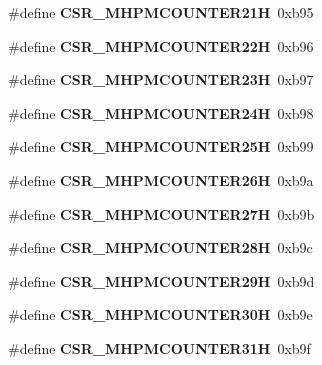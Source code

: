 \begin{DoxyCompactItemize}
\#define {\bfseries C\+S\+R\+\_\+\+M\+H\+P\+M\+C\+O\+U\+N\+T\+E\+R21H}~0xb95
\item 
\mbox{\label{riscv-utility_8h_af39358f2113b1786aafa46fa377efe02}} 
\#define {\bfseries C\+S\+R\+\_\+\+M\+H\+P\+M\+C\+O\+U\+N\+T\+E\+R22H}~0xb96
\item 
\mbox{\label{riscv-utility_8h_aa4611c3b746127c7d163c77c795a1284}} 
\#define {\bfseries C\+S\+R\+\_\+\+M\+H\+P\+M\+C\+O\+U\+N\+T\+E\+R23H}~0xb97
\item 
\mbox{\label{riscv-utility_8h_a693b26559f45e12a02b4e0c3c30895f7}} 
\#define {\bfseries C\+S\+R\+\_\+\+M\+H\+P\+M\+C\+O\+U\+N\+T\+E\+R24H}~0xb98
\item 
\mbox{\label{riscv-utility_8h_a553f8532cccee7b82a78ec77abc99291}} 
\#define {\bfseries C\+S\+R\+\_\+\+M\+H\+P\+M\+C\+O\+U\+N\+T\+E\+R25H}~0xb99
\item 
\mbox{\label{riscv-utility_8h_a5d702fc0207d53d7b5a04c83831a1f93}} 
\#define {\bfseries C\+S\+R\+\_\+\+M\+H\+P\+M\+C\+O\+U\+N\+T\+E\+R26H}~0xb9a
\item 
\mbox{\label{riscv-utility_8h_a13b74054c104d2cb7ee55257d1a812cf}} 
\#define {\bfseries C\+S\+R\+\_\+\+M\+H\+P\+M\+C\+O\+U\+N\+T\+E\+R27H}~0xb9b
\item 
\mbox{\label{riscv-utility_8h_a2fab81807863c7cd55737ab7a1b525f6}} 
\#define {\bfseries C\+S\+R\+\_\+\+M\+H\+P\+M\+C\+O\+U\+N\+T\+E\+R28H}~0xb9c
\item 
\mbox{\label{riscv-utility_8h_a3b046d583c1f3e2f2f55c3b4d176598a}} 
\#define {\bfseries C\+S\+R\+\_\+\+M\+H\+P\+M\+C\+O\+U\+N\+T\+E\+R29H}~0xb9d
\item 
\mbox{\label{riscv-utility_8h_af9fdd0098699ae5c0b46405a7824795a}} 
\#define {\bfseries C\+S\+R\+\_\+\+M\+H\+P\+M\+C\+O\+U\+N\+T\+E\+R30H}~0xb9e
\item 
\mbox{\label{riscv-utility_8h_a943048489f909d6abba06c7fd38075bd}} 
\#define {\bfseries C\+S\+R\+\_\+\+M\+H\+P\+M\+C\+O\+U\+N\+T\+E\+R31H}~0xb9f

\end{DoxyCompactItemize}

